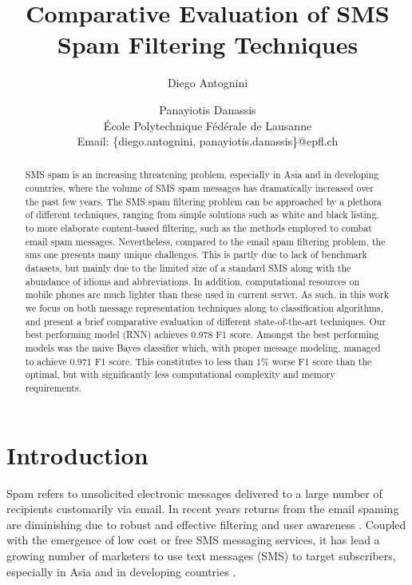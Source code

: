 \documentclass[letterpaper]{article}
\begin{document}
\title{Comparative Evaluation of SMS Spam Filtering Techniques}
\author{Diego Antognini \and Panayiotis Danassis \\
\'Ecole Polytechnique F\'ed\'erale de Lausanne \\
Email: \{diego.antognini, panayiotis.danassis\}@epfl.ch}

\maketitle

\begin{abstract}
	SMS spam is an increasing threatening problem, especially in Asia and in developing countries, where the volume of SMS spam messages has dramatically increased over the past few years. The SMS spam filtering problem can be approached by a plethora of different techniques, ranging from simple solutions such as white and black listing, to more elaborate content-based filtering, such as the methods employed to combat email spam messages. Nevertheless, compared to the email spam filtering problem, the sms one presents many unique challenges. This is partly due to lack of benchmark datasets, but mainly due to the limited size of a standard SMS along with the abundance of idioms and abbreviations. In addition, computational resources on mobile phones are much lighter than these used in current server. As such, in this work we focus on both message representation techniques along to classification algorithms, and present a brief comparative evaluation of different state-of-the-art techniques. Our best performing model (RNN) achieves 0.978 F1 score. Amongst the best performing models was the naive Bayes classifier which, with proper message modeling, managed to achieve 0.971 F1 score. This constitutes to less than $1\%$ worse F1 score than the optimal, but with significantly less computational complexity and memory requirements.
\end{abstract}

\section{Introduction} \label{Introduction}

Spam refers to unsolicited electronic messages delivered to a large number of recipients customarily via email. In recent years returns from the email spaming are diminishing due to robust and effective filtering and user awareness \cite{delany2012sms}. Coupled with the emergence of low cost or free SMS messaging
services, it has lead a growing number of marketers to use text messages (SMS) to target subscribers, especially in Asia and in developing countries \cite{gomez2006content} \cite{yadav2011smsassassin}.
\end{document}
